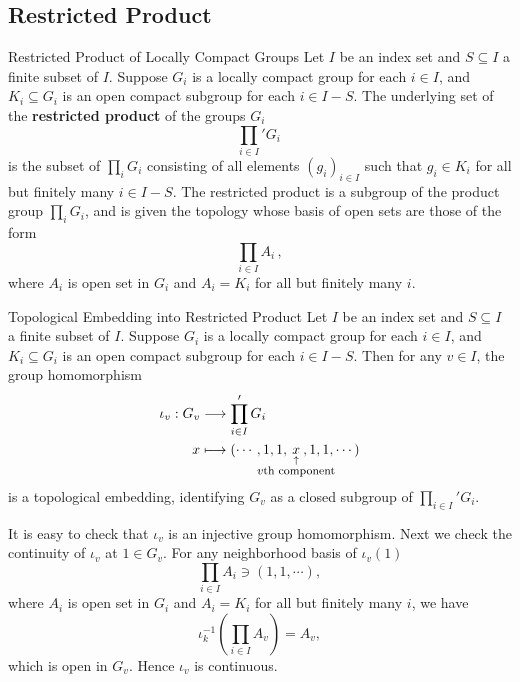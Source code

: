\documentclass{report}
\begin{document}
\subsection{Restricted Product}
\begin{definition}{Restricted Product of Locally Compact Groups}{}
Let \( I \) be an index set and \( S\subseteq I \) a finite subset of \( I \). Suppose \( G_i \) is a locally compact group for each \( i \in I \), and \( K_i \subseteq G_i \) is an open compact subgroup for each \( i \in I - S \). The underlying set of the \textbf{restricted product} of the groups \( G_i \)  
\[
\prod_{i\in I}' G_i\,
\]
is the subset of $\prod_i G_i$ consisting of all elements \( (g_i)_{i \in I} \) such that \( g_i \in K_i \) for all but finitely many \( i \in I - S \). The restricted product is a subgroup of the product group $\prod_i G_i$, and is given the topology whose basis of open sets are those of the form
\[
\prod_{i\in I} A_i\,,
\]
where \( A_i \) is open set in \( G_i \) and \( A_i = K_i \) for all but finitely many \( i \).
\end{definition}

\begin{example}{Topological Embedding into Restricted Product}{}
	Let \( I \) be an index set and \( S\subseteq I \) a finite subset of \( I \). Suppose \( G_i \) is a locally compact group for each \( i \in I \), and \( K_i \subseteq G_i \) is an open compact subgroup for each \( i \in I - S \). Then for any $v\in I$, the group homomorphism
	\begin{align*}
		\iota_v:G_v &\longrightarrow \prod_{i\in I}' G_i \\
		x &\longmapsto (\cdots, 1, 1, \underset{\hspace{-2.3em} \substack{\uparrow \\ \text{\footnotesize $v$th component}}\hspace{-2.3em}}{x},
		1, 1,  \cdots)
	\end{align*}
	is a topological embedding, identifying $G_v$ as a closed subgroup of $\prod_{i\in I}' G_i$.
\end{example}
\begin{prf}
	It is easy to check that $\iota_v$ is an injective group homomorphism. Next we check the continuity of $\iota_v$ at $1\in G_v$. For any neighborhood basis of $\iota_v(1)$
	\[
		\prod_{i\in I} A_i\ni (1,1,\cdots),
	\]
	where $A_i$ is open set in $G_i$ and $A_i=K_i$ for all but finitely many $i$, we have
	\[
		\iota_k^{-1}\left(\prod_{i\in I} A_v\right)=A_v,
	\]
	which is open in $G_v$. Hence $\iota_v$ is continuous. 
\end{prf}
\end{document}
